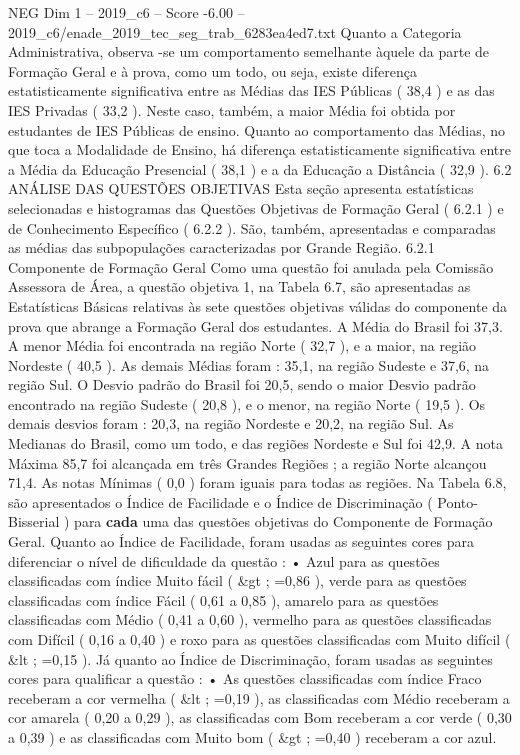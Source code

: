 \begin{textsample}{NEG Dim 1 – 2019\_c6 – Score -6.00 – 2019\_c6/enade\_2019\_tec\_seg\_trab\_6283ea4ed7.txt}
Quanto a Categoria Administrativa, observa -se um comportamento semelhante àquele da parte de Formação Geral e à prova, como um todo, ou seja, existe diferença estatisticamente significativa entre as Médias das IES Públicas ( 38,4 ) e as das IES Privadas ( 33,2 ).
Neste caso, também, a maior Média foi obtida por estudantes de IES Públicas de ensino.
Quanto ao comportamento das Médias, no que toca a Modalidade de Ensino, há diferença estatisticamente significativa entre a Média da Educação Presencial ( 38,1 ) e a da Educação a Distância ( 32,9 ). 6.2 ANÁLISE DAS QUESTÕES OBJETIVAS Esta seção apresenta estatísticas selecionadas e histogramas das Questões Objetivas de Formação Geral ( 6.2.1 ) e de Conhecimento Específico ( 6.2.2 ).
São, também, apresentadas e comparadas as médias das subpopulações caracterizadas por Grande Região. 6.2.1 Componente de Formação Geral Como uma questão foi anulada pela Comissão Assessora de Área, a questão objetiva 1, na Tabela 6.7, são apresentadas as Estatísticas Básicas relativas às sete questões objetivas válidas do componente da prova que abrange a Formação Geral dos estudantes.
A Média do Brasil foi 37,3.
A menor Média foi encontrada na região Norte ( 32,7 ), e a maior, na região Nordeste ( 40,5 ).
As demais Médias foram : 35,1, na região Sudeste e 37,6, na região Sul.
O Desvio padrão do Brasil foi 20,5, sendo o maior Desvio padrão encontrado na região Sudeste ( 20,8 ), e o menor, na região Norte ( 19,5 ).
Os demais desvios foram : 20,3, na região Nordeste e 20,2, na região Sul.
As Medianas do Brasil, como um todo, e das regiões Nordeste e Sul foi 42,9.
A nota Máxima 85,7 foi alcançada em três Grandes Regiões ; a região Norte alcançou 71,4.
As notas Mínimas ( 0,0 ) foram iguais para todas as regiões.
Na Tabela 6.8, são apresentados o Índice de Facilidade e o Índice de Discriminação ( Ponto-Bisserial ) para \textbf{cada} uma das questões objetivas do Componente de Formação Geral.
Quanto ao Índice de Facilidade, foram usadas as seguintes cores para diferenciar o nível de dificuldade da questão : • Azul para as questões classificadas com índice Muito fácil ( \&gt ; =0,86 ), verde para as questões classificadas com índice Fácil ( 0,61 a 0,85 ), amarelo para as questões classificadas com Médio ( 0,41 a 0,60 ), vermelho para as questões classificadas com Difícil ( 0,16 a 0,40 ) e roxo para as questões classificadas com Muito difícil ( \&lt ; =0,15 ).
Já quanto ao Índice de Discriminação, foram usadas as seguintes cores para qualificar a questão : • As questões classificadas com índice Fraco receberam a cor vermelha ( \&lt ; =0,19 ), as classificadas com Médio receberam a cor amarela ( 0,20 a 0,29 ), as classificadas com Bom receberam a cor verde ( 0,30 a 0,39 ) e as classificadas com Muito bom ( \&gt ; =0,40 ) receberam a cor azul.

\end{textsample}
